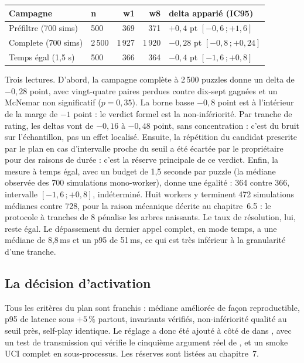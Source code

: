 \begin{center}
\small
\begin{tabular}{llrrl}
\toprule
Campagne & n & w1 & w8 & delta appari\'e (IC95) \\
\midrule
Pr\'efiltre (700 sims) & 500 & 369 & 371 &
$+0{,}4$ pt $[-0{,}6\,;+1{,}6]$ \\
Complete (700 sims) & 2\,500 & 1\,927 & 1\,920 &
$-0{,}28$ pt $[-0{,}8\,;+0{,}24]$ \\
Temps \'egal (1,5 s) & 500 & 366 & 364 &
$-0{,}4$ pt $[-1{,}6\,;+0{,}8]$ \\
\bottomrule
\end{tabular}
\label{tab:qualite}
\end{center}

Trois lectures. D'abord, la campagne compl\`ete \`a 2\,500 puzzles donne un
delta de $-0,28$ point, avec vingt-quatre paires perdues contre dix-sept
gagn\'ees et un McNemar non significatif ($p = 0{,}35$). La borne basse
$-0{,}8$ point est \`a l'int\'erieur de la marge de $-1$ point : le verdict
formel est la non-inf\'eriorit\'e. Par tranche de rating, les deltas vont de
$-0{,}16$ \`a $-0{,}48$ point, sans concentration : c'est du bruit sur
l'\'echantillon, pas un effet localis\'e. Ensuite, la r\'ep\'etition du
candidat prescrite par le plan en cas d'intervalle proche du seuil a \'et\'e
\'ecart\'ee par le propri\'etaire pour des raisons de dur\'ee : c'est la
r\'eserve principale de ce verdict. Enfin, la mesure \`a temps \'egal,
avec un budget de 1,5 seconde par puzzle (la m\'ediane observ\'ee des 700
simulations mono-worker), donne une \'egalit\'e : 364 contre 366, intervalle
$[-1{,}6\,;+0{,}8]$, ind\'etermin\'e. Huit workers y terminent 472
simulations m\'edianes contre 728, pour la raison m\'ecanique d\'ecrite au
chapitre~6.5 : le protocole \`a tranches de 8 p\'enalise les arbres naissants.
Le taux de r\'esolution, lui, reste \'egal. Le d\'epassement du dernier
appel complet, en mode temps, a une m\'ediane de 8,8\,ms et un p95 de
51\,ms, ce qui est tr\`es inf\'erieur \`a la granularit\'e d'une tranche.

\subsection{La d\'ecision d'activation}

Tous les crit\`eres du plan sont franchis : m\'ediane am\'elior\'ee de
fa\c{c}on reproductible, p95 de latence sous $+5\,\%$ partout, invariants
v\'erifi\'es, non-inf\'eriorit\'e qualit\'e au seuil pr\`es, self-play
identique. Le r\'eglage  a donc \'et\'e ajout\'e
\`a c\^ot\'e de  dans , avec un test
de transmission qui v\'erifie le cinqui\`eme argument r\'eel de
, et un smoke UCI complet en sous-processus. Les
r\'eserves sont list\'ees au chapitre~7.
